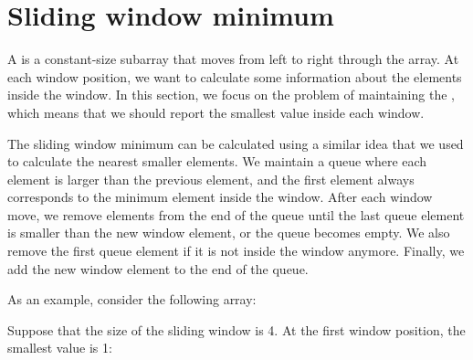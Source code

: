 \documentclass[twoside,12pt,a4paper,english]{book}
\theoremstyle{definition}
\theoremstyle{problemstyle}
\theoremstyle{problemstyle}
\theoremstyle{problemstyle}
\begin{document}
\section{Sliding window minimum}

A  is a constant-size subarray
that moves from left to right through the array.
At each window position,
we want to calculate some information
about the elements inside the window.
In this section, we focus on the problem
of maintaining the ,
which means that
we should report the smallest value inside each window.

The sliding window minimum can be calculated
using a similar idea that we used to calculate
the nearest smaller elements.
We maintain a queue
where each element is larger than
the previous element,
and the first element
always corresponds to the minimum element inside the window.
After each window move,
we remove elements from the end of the queue
until the last queue element
is smaller than the new window element,
or the queue becomes empty.
We also remove the first queue element
if it is not inside the window anymore.
Finally, we add the new window element
to the end of the queue.

As an example, consider the following array:

\begin{center}
\end{center}

Suppose that the size of the sliding window is 4.
At the first window position, the smallest value is 1:
\begin{center}
\end{center}
\end{document}

